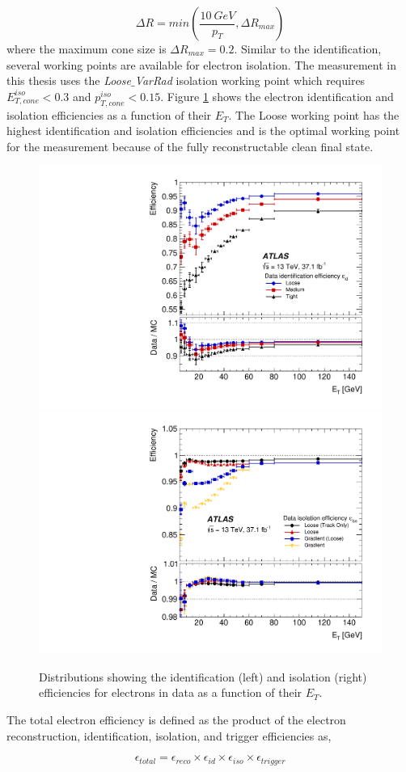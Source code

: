 \begin{equation}
\Delta R = min \left( \frac{10 ~ GeV}{p_{T}},\Delta R_{max} \right)
\end{equation}
where the maximum cone size is $\Delta R_{max} = 0.2$. Similar to the identification, several working points are available for electron isolation. The measurement in this thesis uses the \textit{Loose$\_$VarRad} isolation working point which requires $E_{T,cone}^{iso} < 0.3$ and $p_{T,cone}^{iso} < 0.15$. Figure \ref{fig:ElecEff} shows the electron identification and isolation efficiencies as a function of their $E_{T}$. The Loose working point has the highest identification and isolation efficiencies and is the optimal working point for the measurement because of the fully reconstructable clean final state.

\begin{figure}[!htb]
    \centering
    \includegraphics[width=.49\linewidth]{figures/LHC/ElecIdent_Eff.pdf}
    \includegraphics[width=.49\linewidth]{figures/LHC/Elec_IsoEff.pdf}
    \caption{ Distributions showing the identification (left) and isolation (right) efficiencies for electrons in data as a function of their $E_{T}$\cite{ElectronReco}.\label{fig:ElecEff}}
\end{figure}

The total electron efficiency is defined as the product of the electron reconstruction, identification, isolation, and trigger efficiencies as, 

\begin{equation}
    \epsilon_{total} = \epsilon_{reco} \times \epsilon_{id} \times \epsilon_{iso} \times \epsilon_{trigger}     
\end{equation}

